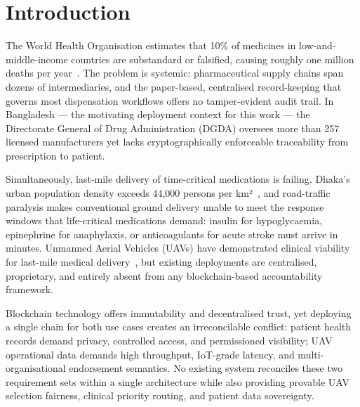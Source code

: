 \documentclass[sigplan,screen]{acmart}
\begin{document}

\maketitle

\section{Introduction}\label{sec:intro}

The World Health Organisation estimates that 10\% of medicines in
low-and-middle-income countries are substandard or falsified, causing roughly
one million deaths per year~\cite{who2017falsified}.
The problem is systemic: pharmaceutical supply chains span dozens of
intermediaries, and the paper-based, centralised record-keeping that governs
most dispensation workflows offers no tamper-evident audit trail.
In Bangladesh — the motivating deployment context for this work — the
Directorate General of Drug Administration (DGDA) oversees more than 257
licensed manufacturers yet lacks cryptographically enforceable traceability
from prescription to patient.

Simultaneously, last-mile delivery of time-critical medications is failing.
Dhaka's urban population density exceeds 44,000 persons per km²~\cite{bbs2022census},
and road-traffic paralysis makes conventional ground delivery unable to meet
the response windows that life-critical medications demand:
insulin for hypoglycaemia, epinephrine for anaphylaxis, or anticoagulants
for acute stroke must arrive in minutes.
Unmanned Aerial Vehicles (UAVs) have demonstrated clinical viability
for last-mile medical delivery~\cite{zipline2022lancet,thiels2015uav},
but existing deployments are centralised, proprietary, and entirely absent
from any blockchain-based accountability framework.

Blockchain technology offers immutability and decentralised trust, yet
deploying a single chain for both use cases creates an irreconcilable conflict:
patient health records demand privacy, controlled access, and permissioned
visibility; UAV operational data demands high throughput, IoT-grade latency,
and multi-organisational endorsement semantics.
No existing system reconciles these two requirement sets within a single
architecture while also providing provable UAV selection fairness, clinical
priority routing, and patient data sovereignty.
\end{document}
